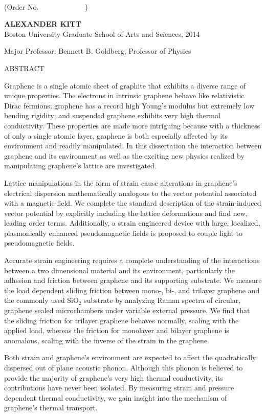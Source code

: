 \begin{center}

\textbf{\thesistitle}\\

(Order No.\ \ \ \ \ \ \ \ \ \ \ \ \ )

\textbf{ALEXANDER KITT}\\
Boston University Graduate School of Arts and Sciences, 2014\\
\begin{singlespace}
	Major Professor: Bennett B. Goldberg, Professor of Physics
\end{singlespace}

ABSTRACT

\end{center}
\vspace{-15 pt}  %

Graphene is a single atomic sheet of graphite that exhibits a diverse range of unique properties.
The electrons in intrinsic graphene behave like relativistic Dirac fermions; graphene has a record high Young's modulus but extremely low bending rigidity; and suspended graphene exhibits very high thermal conductivity.
These properties are made more intriguing because with a thickness of only a single atomic layer, graphene is both especially affected by its environment and readily manipulated.
In this dissertation the interaction between graphene and its environment as well as the exciting new physics realized by manipulating graphene's lattice are investigated.

Lattice manipulations in the form of strain cause alterations in graphene's electrical dispersion mathematically analogous to the vector potential associated with a magnetic field.
We complete the standard description of the strain-induced vector potential by explicitly including the lattice deformations and find new, leading order terms.
Additionally, a strain engineered device with large, localized, plasmonically enhanced pseudomagnetic fields is proposed to couple light to pseudomagnetic fields.

Accurate strain engineering requires a complete understanding of the interactions between a two dimensional material and its environment, particularly the adhesion and friction between graphene and its supporting substrate.
We measure the load dependent sliding friction between mono-, bi-, and trilayer graphene and the commonly used SiO$_2$ substrate by analyzing Raman spectra of circular, graphene sealed microchambers under variable external pressure.
We find that the sliding friction for trilayer graphene behaves normally, scaling with the applied load, whereas the friction for monolayer and bilayer graphene is anomalous, scaling with the inverse of the strain in the graphene.

Both strain and graphene's environment are expected to affect the quadratically dispersed out of plane acoustic phonon.
Although this phonon is believed to provide the majority of graphene's very high thermal conductivity, its contributions have never been isolated.
By measuring strain and pressure dependent thermal conductivity, we gain insight into the mechanism of graphene's thermal transport. 

\newpage
